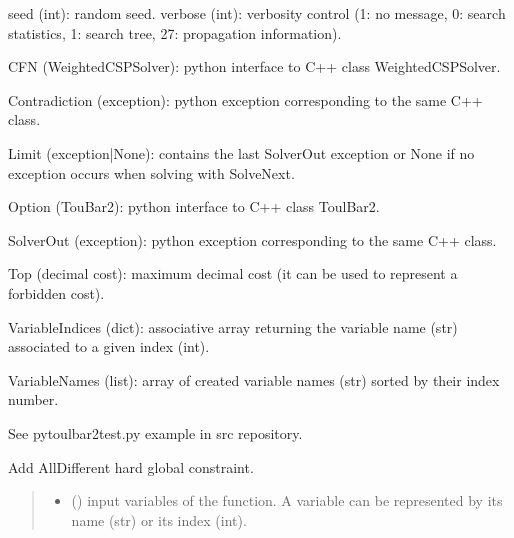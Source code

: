 \documentclass[letterpaper,10pt,openany,oneside,english]{sphinxmanual}
\begin{document}
\begin{fulllineitems}
\begin{description}
\sphinxAtStartPar
seed (int): random seed.
verbose (int): verbosity control (\sphinxhyphen{}1: no message, 0: search statistics, 1: search tree, 2\sphinxhyphen{}7: propagation information).

\sphinxAtStartPar
CFN (WeightedCSPSolver): python interface to C++ class WeightedCSPSolver.

\sphinxAtStartPar
Contradiction (exception): python exception corresponding to the same C++ class.

\sphinxAtStartPar
Limit (exception|None): contains the last SolverOut exception or None if no exception occurs when solving with SolveNext.

\sphinxAtStartPar
Option (TouBar2): python interface to C++ class ToulBar2.

\sphinxAtStartPar
SolverOut (exception): python exception corresponding to the same C++ class.

\sphinxAtStartPar
Top (decimal cost): maximum decimal cost (it can be used to represent a forbidden cost).

\sphinxAtStartPar
VariableIndices (dict): associative array returning the variable name (str) associated to a given index (int).

\sphinxAtStartPar
VariableNames (list): array of created variable names (str) sorted by their index number.

\end{description}

\sphinxAtStartPar
See pytoulbar2test.py example in src repository.

\begin{fulllineitems}
\label{\detokenize{ref/ref_python:pytoulbar2.CFN.AddAllDifferent}}
\pysigstartsignatures
{}
\pysigstopsignatures
\sphinxAtStartPar
Add AllDifferent hard global constraint.
\begin{quote}\begin{description}
\begin{itemize}
\item {} 
\sphinxAtStartPar
{} () \textendash{} input variables of the function. A variable can be represented by its name (str) or its index (int).


\end{itemize}
\end{description}
\end{quote}
\end{fulllineitems}
\end{fulllineitems}
\end{document}
